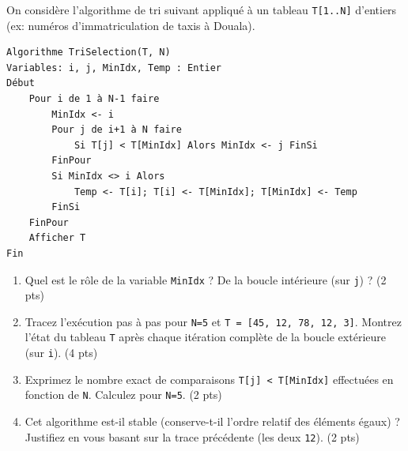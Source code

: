 \documentclass[11pt]{article}
\begin{document}
\begin{exercice}
On considère l'algorithme de tri suivant appliqué à un tableau \texttt{T[1..N]} d'entiers (ex: numéros d'immatriculation de taxis à Douala).
\begin{verbatim}
Algorithme TriSelection(T, N)
Variables: i, j, MinIdx, Temp : Entier
Début
    Pour i de 1 à N-1 faire
        MinIdx <- i
        Pour j de i+1 à N faire
            Si T[j] < T[MinIdx] Alors MinIdx <- j FinSi
        FinPour
        Si MinIdx <> i Alors
            Temp <- T[i]; T[i] <- T[MinIdx]; T[MinIdx] <- Temp
        FinSi
    FinPour
    Afficher T
Fin
\end{verbatim}
\begin{enumerate}
    \item Quel est le rôle de la variable \texttt{MinIdx} ? De la boucle intérieure (sur \texttt{j}) ? (2 pts)
    \item Tracez l'exécution pas à pas pour \texttt{N=5} et \texttt{T = [45, 12, 78, 12, 3]}.
    Montrez l'état du tableau \texttt{T} après chaque itération complète de la boucle extérieure (sur \texttt{i}). (4 pts)
    \item Exprimez le nombre exact de comparaisons \texttt{T[j] < T[MinIdx]} effectuées en fonction de \texttt{N}. Calculez pour \texttt{N=5}. (2 pts)
    \item Cet algorithme est-il stable (conserve-t-il l'ordre relatif des éléments égaux) ? Justifiez en vous basant sur la trace précédente (les deux \texttt{12}). (2 pts)
\end{enumerate}
\end{exercice}
\end{document}
